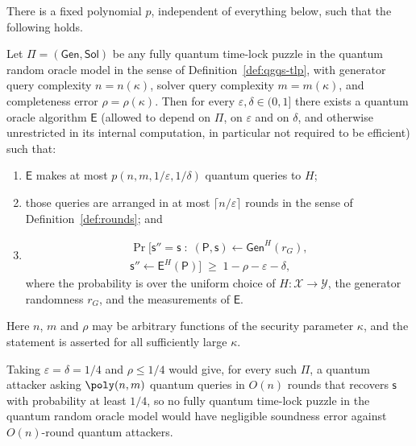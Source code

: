 \documentclass{conjura-conjecture}
\newcommand{\Gen}{\mathsf{Gen}}
\newcommand{\Sol}{\mathsf{Sol}}
\newcommand{\Ext}{\mathsf{E}}
\newcommand{\puz}{\mathsf{P}}
\newcommand{\solu}{\mathsf{s}}
\newcommand{\solatt}{\mathsf{s}''}
\begin{document}
\begin{conjecture}\label{conj:main}
There is a fixed polynomial $p$, independent of everything below, such that
the following holds.

Let $\Pi = (\Gen, \Sol)$ be any fully quantum time-lock puzzle in the
quantum random oracle model in the sense of
Definition~\ref{def:qgqs-tlp}, with generator query complexity
$n = n(\kappa)$, solver query complexity $m = m(\kappa)$, and completeness
error $\rho = \rho(\kappa)$. Then for every
$\varepsilon, \delta \in (0,1]$ there exists a quantum oracle algorithm
$\Ext$ (allowed to depend on $\Pi$, on $\varepsilon$ and on $\delta$, and
otherwise unrestricted in its internal computation, in particular not
required to be efficient) such that:
\begin{enumerate}
  \item $\Ext$ makes at most $p(n, m, 1/\varepsilon, 1/\delta)$ quantum
    queries to $H$;
  \item those queries are arranged in at most
    $\lceil n/\varepsilon \rceil$ rounds in the sense of
    Definition~\ref{def:rounds}; and
  \item
    \begin{multline*}
      \Pr\bigl[\solatt = \solu \;:\;
        (\puz, \solu) \leftarrow \Gen^{H}(r_G), \\
        \solatt \leftarrow \Ext^{H}(\puz)\bigr]
        \;\ge\; 1 - \rho - \varepsilon - \delta,
    \end{multline*}
    where the probability is over the uniform choice of
    $H \colon \mathcal{X} \to \mathcal{Y}$, the generator randomness
    $r_G$, and the measurements of $\Ext$.
\end{enumerate}
Here $n$, $m$ and $\rho$ may be arbitrary functions of the security
parameter $\kappa$, and the statement is asserted for all sufficiently
large $\kappa$.
\end{conjecture}

\begin{corollary}\label{cor:consequence}
Taking $\varepsilon = \delta = 1/4$ and $\rho \le 1/4$ would give, for
every such $\Pi$, a quantum attacker asking $\poly(n,m)$ quantum queries in
$O(n)$ rounds that recovers $\solu$ with probability at least $1/4$, so no
fully quantum time-lock puzzle in the quantum random oracle model would
have negligible soundness error against $O(n)$-round quantum attackers.
\end{corollary}
\end{document}
